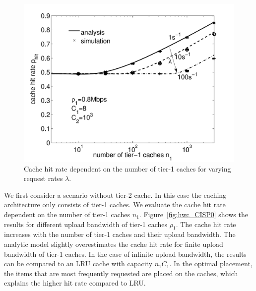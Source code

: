 \begin{figure}[bt]
\begin{minipage}[b]{0.32\textwidth}
  \label{fig:hwc_l1C8_C2}
\end{minipage}
\hspace{0.01\textwidth}
\begin{minipage}[b]{0.32\textwidth}
  \centering
  \includegraphics[width=1\textwidth]{hierarchical/analyticbw/figures/hwc_C8C1e3_l0}
  \caption{Cache hit rate dependent on the number of tier-1 caches for varying request rates $\lambda$.}
  \label{fig:hwc_C8C1e3_l}
\end{minipage}
\end{figure}


We first consider a scenario without tier-2 cache.
In this case the caching architecture only consists of tier-1 caches.
We evaluate the cache hit rate dependent on the number of tier-1 caches $n_1$.
Figure~\ref{fig:hwc_CISP0} shows the results for different upload bandwidth of tier-1 caches $\rho_1$.
The cache hit rate increases with the number of tier-1 caches and their upload bandwidth.
The analytic model slightly overestimates the cache hit rate for finite upload bandwidth of tier-1 caches.
In the case of infinite upload bandwidth, the results can be compared to an LRU cache with capacity $n_1 C_1$.
In the optimal placement, the items that are most frequently requested are placed on the caches, which explains the higher hit rate compared to LRU.

